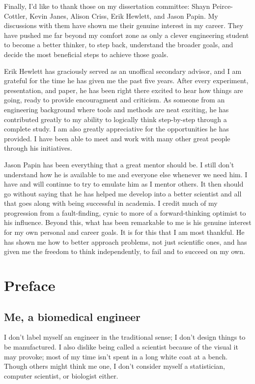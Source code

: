 Finally, I'd like to thank those on my dissertation committee:
Shayn Peirce-Cottler, Kevin Janes, Alison Criss, Erik Hewlett, and Jason Papin.
My discussions with them have shown me their genuine interest in my career.
They have pushed me far beyond my comfort zone as only
a clever engineering student to become a better thinker, to step
back, understand the broader goals, and decide the most beneficial
steps to achieve those goals.

Erik Hewlett has graciously served as an unoffical secondary advisor,
and I am grateful for the time he has given me the past five years.
After every experiment, presentation, and paper, he has been right there
excited to hear how things are going, ready to provide encouragment and criticism.
As someone from an engineering background where tools and 
methods are neat exciting,
he has contributed greatly to my ability to logically think step-by-step
through a complete study. I am also greatly appreciative for the opportunities he has provided.
I have been able to meet and work with many other great people through his initiatives.

Jason Papin has been everything that a great mentor should be.
I still don't understand how he is available to me and everyone else
whenever we need him.
I have and will continue to try to emulate him as I mentor others.
It then should go without saying that he has helped me develop
into a better scientist and all that goes along with being successful in academia.
I credit much of my progression from a fault-finding, cynic to more of a  
forward-thinking optimist to his influence.
Beyond this, what has been remarkable to me is his genuine interest for 
my own personal and career goals. It is for this that I am most thankful.
He has shown me how to better approach problems, not just scientific ones, and has
given me the freedom to think independently, to fail and to succeed on my own.


\chapter{Preface}

\section{Me, a biomedical engineer}

I don't label myself an engineer in the traditional sense; 
I don't design things to be manufactured. I also dislike 
being called a scientist because of the visual it may provoke; 
most of my time isn't spent in a long white coat at a 
bench. Though others might think me one, I don't consider 
myself a statistician, computer scientist, or biologist either.

